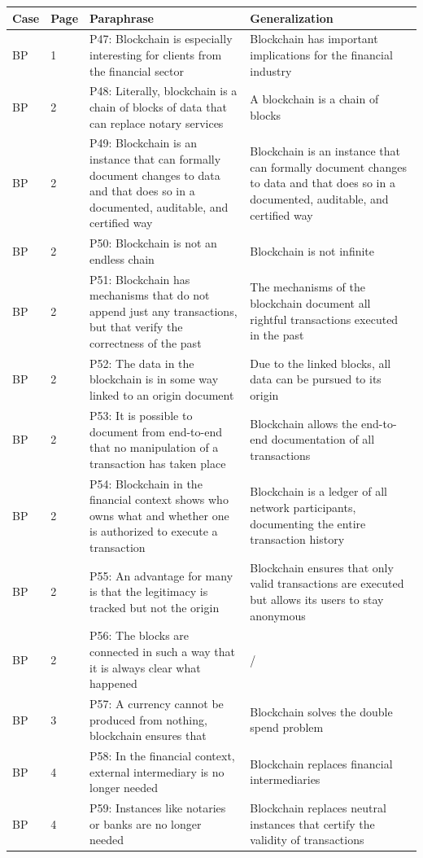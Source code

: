 \begin{table}[H]
    \centering
    \begin{tabularx}{\textwidth}{ll|X|p{4.5cm}}
	Case & Page & Paraphrase & Generalization\\ \hline
	BP & 1 & P47: Blockchain is especially interesting for clients from the financial sector & Blockchain has important implications for the financial industry \\ 
	BP & 2 & P48: Literally, blockchain is a chain of blocks of data that can replace notary services & A blockchain is a chain of blocks \\ 
	BP & 2 & P49: Blockchain is an instance that can formally document changes to data and that does so in a documented, auditable, and certified way & Blockchain is an instance that can formally document changes to data and that does so in a documented, auditable, and certified way \\ 
	BP & 2 & P50: Blockchain is not an endless chain & Blockchain is not infinite \\ 
	BP & 2 & P51: Blockchain has mechanisms that do not append just any transactions, but that verify the correctness of the past & The mechanisms of the blockchain document all rightful transactions executed in the past  \\ 
	BP & 2 & P52: The data in the blockchain is in some way linked to an origin document & Due to the linked blocks, all data can be pursued to its origin \\ 
	BP & 2 & P53: It is possible to document from end-to-end that no manipulation of a transaction has taken place & Blockchain allows the end-to-end documentation of all transactions \\ 
	BP & 2 & P54: Blockchain in the financial context shows who owns what and whether one is authorized to execute a transaction & Blockchain is a ledger of all network participants, documenting the entire transaction history \\ 
	BP & 2 & P55: An advantage for many is that the legitimacy is tracked but not the origin & Blockchain ensures that only valid transactions are executed but allows its users to stay anonymous  \  \\ 
	BP & 2 & P56: The blocks are connected in such a way that it is always clear what happened & /   \\ 
	BP & 3 & P57: A currency cannot be produced from nothing, blockchain ensures that & Blockchain solves the double spend problem   \\ 
	BP & 4 & P58: In the financial context, external intermediary is no longer needed & Blockchain replaces financial intermediaries   \\ 
	BP & 4 & P59: Instances like notaries or banks are no longer needed & Blockchain replaces neutral instances that certify the validity of transactions   \\ 
    \end{tabularx}
\end{table}

